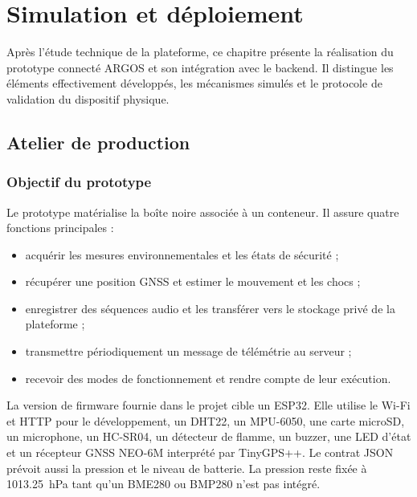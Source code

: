 \chapter{Simulation et déploiement}
\label{chap-simulation}

Après l'étude technique de la plateforme, ce chapitre présente la réalisation
du prototype connecté ARGOS et son intégration avec le backend. Il distingue
les éléments effectivement développés, les mécanismes simulés et le protocole
de validation du dispositif physique.

\newcommand{\photoattendue}[1]{%
\begin{figure}[!htbp]
\centering
\fbox{\begin{minipage}[c][5.8cm][c]{0.86\textwidth}
\centering\mbox{}
\end{minipage}}
\caption{#1}
\end{figure}}

\section{Atelier de production}
\subsection{Objectif du prototype}

Le prototype matérialise la boîte noire associée à un conteneur. Il assure
quatre fonctions principales :
\begin{itemize}
    \item acquérir les mesures environnementales et les états de sécurité ;
    \item récupérer une position GNSS et estimer le mouvement et les chocs ;
    \item enregistrer des séquences audio et les transférer vers le stockage
    privé de la plateforme ;
    \item transmettre périodiquement un message de télémétrie au serveur ;
    \item recevoir des modes de fonctionnement et rendre compte de leur
    exécution.
\end{itemize}

La version de firmware fournie dans le projet cible un ESP32. Elle utilise
le Wi-Fi et HTTP pour le développement, un DHT22, un MPU-6050, une carte
microSD, un microphone, un HC-SR04, un détecteur de flamme, un buzzer, une LED
d'état et un récepteur GNSS NEO-6M interprété par TinyGPS++. Le contrat JSON
prévoit aussi la pression et le niveau de batterie. La pression reste fixée à
\SI{1013.25}{\hecto\pascal} tant qu'un BME280 ou BMP280 n'est pas intégré.

